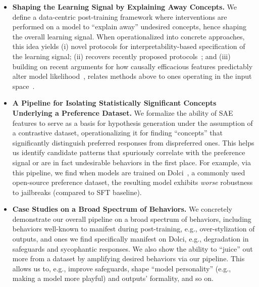 \documentclass{article} %
\begin{document}
\begin{itemize}[leftmargin=*]

    \item \textbf{Shaping the Learning Signal by Explaining Away Concepts.} 
    We define a data-centric post-training framework where interventions are performed on a model to ``explain away'' undesired concepts, hence shaping the overall learning signal.
    When operationalized into concrete approaches, this idea yields (i) novel protocols for interpretability-based specification of the learning signal; (ii) recovers recently proposed protocols~\citep{chen2025persona, casademunt2025steering, cloud2024gradient, prasad2026features}; and (iii) building on recent arguments for how causally efficacious features predictably alter model likelihood~\citep{bigelow2025belief}, relates methods above to ones operating in the input space~\citep{rathi2026shaping, tan2025inoculation, wichers2025inoculation}.
    
    
    \item \textbf{A Pipeline for Isolating Statistically Significant Concepts Underlying a Preference Dataset.} 
    We formalize the ability of SAE features to serve as a basis for hypothesis generation under the assumption of a contrastive dataset, operationalizing it for finding ``concepts'' that significantly distinguish preferred responses from dispreferred ones. This helps us identify candidate patterns that spuriously correlate with the preference signal or are in fact undesirable behaviors in the first place. For example, via this pipeline, we find when models are trained on Dolci~\citep{olmo2025olmo}, a commonly used open-source preference dataset, the resulting model exhibits \textit{worse} robustness to jailbreaks (compared to SFT baseline).
    

    \item \textbf{Case Studies on a Broad Spectrum of Behaviors.}
    We concretely demonstrate our overall pipeline on a broad spectrum of behaviors, including behaviors well-known to manifest during post-training, e.g., over-stylization of outputs, and ones we find specifically manifest on Dolci, e.g., degradation in safeguards and sycophantic responses. We also show the ability to ``juice'' out more from a dataset by amplifying desired behaviors via our pipeline. This allows us to, e.g., improve safeguards, shape ``model personality'' (e.g., making a model more playful) and outputs' formality, and so on.
    
\end{itemize}
\end{document}
